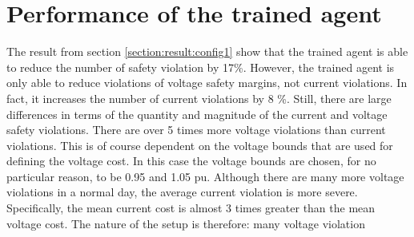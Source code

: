 \documentclass[class=book, crop=false]{standalone}
\begin{document}
\section{Performance of the trained agent}
The result from section \ref{section:result:config1} show that the trained agent is able to reduce the number of safety violation by 17\%. However, the trained agent is only able to reduce violations of voltage safety margins, not current violations. In fact, it increases the number of current violations by 8 \%. Still, there are large differences in terms of the quantity and magnitude of the current and voltage safety violations. There are over 5 times more voltage violations than current violations. This is of course dependent on the voltage bounds that are used for defining the voltage cost. In this case the voltage bounds are chosen, for no particular reason, to be 0.95 and 1.05 pu. Although there are many more voltage violations in a normal day, the average current violation is more severe. Specifically, the mean current cost is almost 3 times greater than the mean voltage cost. The nature of the setup is therefore: many voltage violation
\end{document}
